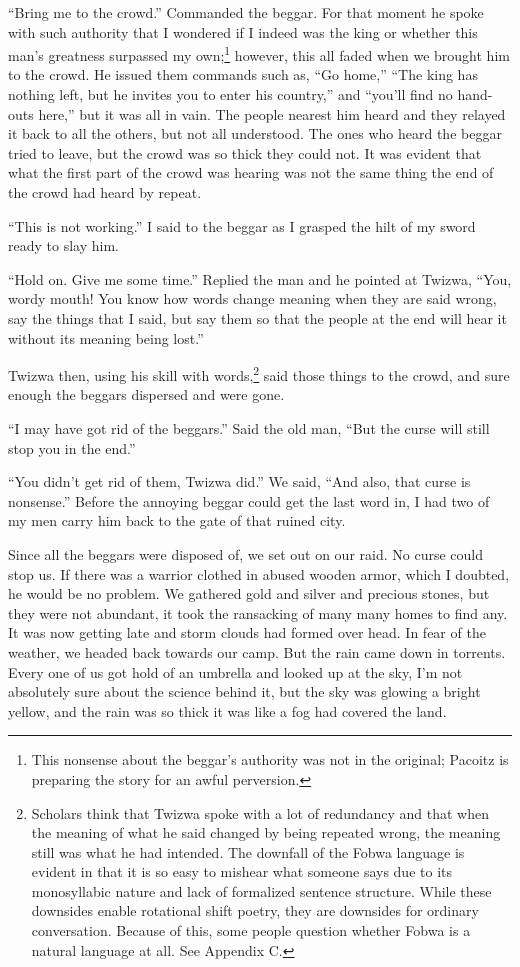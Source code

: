 \tbreak

``Bring me to the crowd.'' Commanded the beggar. For that moment he spoke with such authority that I wondered if I indeed was the king or whether this man's greatness surpassed my own;\footnote{This nonsense about the beggar's authority was not in the original; Pacoitz is preparing the story for an awful perversion.} however, this all faded when we brought him to the crowd.
He issued them commands such as, ``Go home,'' ``The king has nothing left, but he invites you to enter his country,'' and ``you'll find no hand-outs here,'' but it was all in vain. The people nearest him heard and they relayed it back to all the others, but not all understood. The ones who heard the beggar tried to leave, but the crowd was so thick they could not. It was evident that what the first part of the crowd was hearing was not the same thing the end of the crowd had heard by repeat.

``This is not working.'' I said to the beggar as I grasped the hilt of my sword ready to slay him.

``Hold on. Give me some time.'' Replied the man and he pointed at Twizwa, ``You, wordy mouth! You know how words change meaning when they are said wrong, say the things that I said, but say them so that the people at the end will hear it without its meaning being lost.''

Twizwa then, using his skill with words,\footnote{Scholars think that Twizwa spoke with a lot of redundancy and that when the meaning of what he said changed by being repeated wrong, the meaning still was what he had intended. The downfall of the Fo\-bwa language is evident in that it is so easy to mishear what someone says due to its monosyllabic nature and lack of formalized sentence structure. While these downsides enable rotational shift poetry, they are downsides for ordinary conversation. Because of this, some people question whether Fobwa is a natural language at all. See Appendix C.} said those things to the crowd, and sure enough the beggars dispersed and were gone.

``I may have got rid of the beggars.'' Said the old man, ``But the curse will still stop you in the end.''

``You didn't get rid of them, Twizwa did.'' We said, ``And also, that curse is nonsense.'' 
Before the annoying beggar could get the last word in, I had two of my men carry him back to the gate of that ruined city.

Since all the beggars were disposed of, we set out on our raid. No curse could stop us. If there was a warrior clothed in abused wooden armor, which I doubted, he would be no problem. We gathered gold and silver and precious stones, but they were not abundant, it took the ransacking of many many homes to find any. It was now getting late and storm clouds had formed over head. In fear of the weather, we headed back towards our camp. But the rain came down in torrents. Every one of us got hold of an umbrella and looked up at the sky, I'm not absolutely sure about the science behind it, but the sky was glowing a bright yellow, and the rain was so thick it was like a fog had covered the land.

